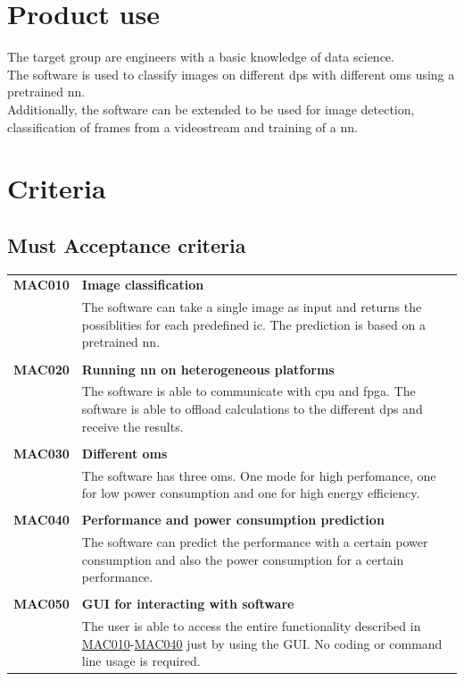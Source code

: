 \documentclass[parskip=full]{scrartcl}
\begin{document}
\section{Product use}
The target group are engineers with a basic knowledge of data science.\\
The software is used to classify images on different \glspl{dp} with different \glspl{om} using a pretrained \gls{nn}.\\
Additionally, the software can be extended to be used for image detection, classification of frames from a videostream and training of a \gls{nn}.


\section{Criteria}
\subsection{Must Acceptance criteria}
\begin{tabular}{p{2cm}p{11.4cm}}
\textbf{MAC010} \hypertarget{MAC010} & \textbf{Image classification} \\
& The software can take a single image as input and returns the possiblities for each predefined \gls{ic}. The prediction is based on a pretrained \gls{nn}.\\
& \\
\textbf{MAC020} \hypertarget{MAC020} & \textbf{Running \gls{nn} on heterogeneous platforms} \\
& The software is able to communicate with \gls{cpu} and \gls{fpga}. The software is able to offload calculations to the different \glspl{dp} and receive the results.\\
& \\
\textbf{MAC030} \hypertarget{MAC030} & \textbf{Different \glspl{om}} \\
& The software has three \glspl{om}. One mode for high perfomance, one for low \gls{power consumption} and one for high energy efficiency. \\
& \\
\textbf{MAC040} \hypertarget{MAC040} & \textbf{Performance and \gls{power consumption} prediction}\\
& The software can predict the \gls{performance} with a certain \gls{power consumption} and also the \gls{power consumption} for a certain \gls{performance}.\\
& \\
\textbf{MAC050} \hypertarget{MAC050} & \textbf{GUI for interacting with software} \\
& The user is able to access the entire functionality described in \hyperlink{MAC010}{MAC010}-\hyperlink{MAC040}{MAC040} just by using the GUI. No coding or command line usage is required.
\end{tabular}
\end{document}
